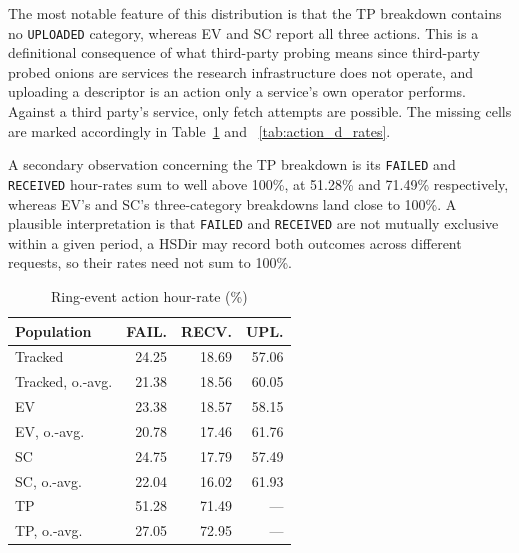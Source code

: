 \documentclass[conference]{IEEEtran}
\begin{document}
The most notable feature of this distribution is that the TP breakdown contains no \texttt{UPLOADED} category, whereas EV and SC report all three actions. 
This is a definitional consequence of what third-party probing means since third-party probed onions are services the research infrastructure does not operate, and 
uploading a descriptor is an action only a service's own operator performs. Against a third party's service, only fetch attempts are possible. The missing cells are marked 
accordingly in Table~\ref{tab:action_h_rates} and ~\ref{tab:action_d_rates}.
 
A secondary observation concerning the TP breakdown is its \texttt{FAILED} and \texttt{RECEIVED} hour-rates sum to well above 100\%, at 51.28\% and 71.49\% respectively,
whereas EV's and SC's three-category breakdowns land close to 100\%. A plausible interpretation is that \texttt{FAILED} and \texttt{RECEIVED} are not mutually exclusive 
within a given period, a HSDir may record both outcomes across different requests, so their rates need not sum to 100\%.

\begin{table}[htbp]
\caption{Ring-event action hour-rate (\%)}
\begin{center}
\begin{tabular}{|l|r|r|r|}
\hline
\textbf{Population} & \textbf{FAIL.} & \textbf{RECV.} & \textbf{UPL.} \\
\hline
Tracked & 24.25 & 18.69 & 57.06 \\
\hline
Tracked, o.-avg. & 21.38 & 18.56 & 60.05 \\
\hline
EV & 23.38 & 18.57 & 58.15 \\
\hline
EV, o.-avg. & 20.78 & 17.46 & 61.76 \\
\hline
SC & 24.75 & 17.79 & 57.49 \\
\hline
SC, o.-avg. & 22.04 & 16.02 & 61.93 \\
\hline
TP & 51.28 & 71.49 & --- \\
\hline
TP, o.-avg. & 27.05 & 72.95 & --- \\
\hline
\end{tabular}
\label{tab:action_h_rates}
\end{center}
\end{table}
\end{document}
